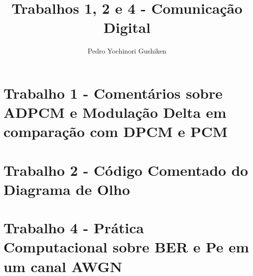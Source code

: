 \documentclass[11pt]{report}
\title{Trabalhos 1, 2 e 4 - Comunicação Digital}
\author{Pedro Yochinori Gushiken}
\begin{document}
\maketitle
\tableofcontents
\chapter{Trabalho 1 - Comentários sobre ADPCM e Modulação Delta em comparação com DPCM e PCM}

\chapter{Trabalho 2 - Código Comentado do Diagrama de Olho}

\chapter{Trabalho 4 - Prática Computacional sobre BER e Pe em um canal AWGN}

\end{document}
